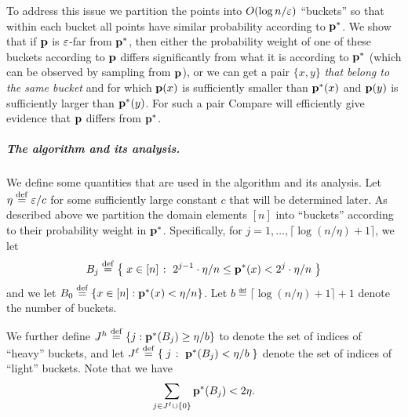To address this issue
we partition the points into $O(\log n/\varepsilon)$
``buckets'' so that within each bucket
all points have similar probability according to $\mathbf{p}^\ast$. We
show that if $\mathbf{p}$ is $\varepsilon$-far from $\mathbf{p}^\ast$, then either
the probability weight of one of these buckets according to $\mathbf{p}$
differs significantly from what it is according to $\mathbf{p}^\ast$
(which can be observed by sampling from $\mathbf{p}$), or we can get
a pair $\{x,y\}$ {\em that belong to the same bucket\/} and for
which $\mathbf{p}(x)$ is sufficiently smaller than $\mathbf{p}^\ast(x)$ and
$\mathbf{p}(y)$ is sufficiently larger than $\mathbf{p}^\ast(y)$.  For such a pair
{\sc Compare} will efficiently give evidence that
$\mathbf{p}$ differs from $\mathbf{p}^\ast$.

\medskip

\subparagraph{The algorithm and its analysis.}
We define some quantities that are used in the algorithm and its analysis.
Let ${\eta} \stackrel{\rm def}{=} \varepsilon/c$ for some sufficiently large constant $c$
that will be determined later.
As described above we partition the domain elements $[n]$ into
``buckets'' according
to their probability weight in $\mathbf{p}^\ast$.
Specifically, for $j = 1,\dots, \lceil \log(n/\eta)+1\rceil$, we let
\begin{equation} \label{eq:Bj-def}
B_j \stackrel{\rm def}{=} \left\{\;  x \in [n]  \;\colon\;  2^{j-1}\cdot \eta/n \leq \mathbf{p}^\ast(x) < 2^j\cdot \eta/n \; \right\}
\end{equation}
and we let $B_0 \stackrel{\rm def}{=} \{x \in [n]: \mathbf{p}^\ast(x) < \eta/n\}$.
Let $b \eqdef \lceil \log(n/\eta)+1\rceil +1$ denote the number of buckets.

We further define $J^h \stackrel{\rm def}{=} \{j: \mathbf{p}^\ast(B_j) \geq \eta/b\}$ to denote the set of indices
of ``heavy'' buckets, and let
$J^\ell \stackrel{\rm def}{=}\left\{\; j  \;\colon\;  \mathbf{p}^\ast(B_j)< \eta/b \; \right\}$ denote the set of indices
of ``light'' buckets.  Note that we have
\begin{equation} \label{eq:Jell-light}
\sum_{j\in J^\ell\cup \{0\}}\mathbf{p}^\ast(B_j) < 2\eta.
\end{equation}


